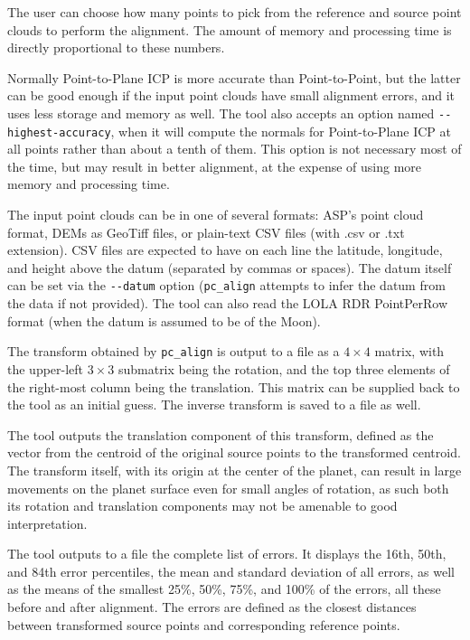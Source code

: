 The user can choose how many points to pick from the reference and
source point clouds to perform the alignment. The amount of memory and
processing time is directly proportional to these numbers.

Normally Point-to-Plane ICP is more accurate than Point-to-Point, but
the latter can be good enough if the input point clouds have small
alignment errors, and it uses less storage and memory as well.  The tool
also accepts an option named \texttt{-\/-highest-accuracy}, when it will
compute the normals for Point-to-Plane ICP at all points rather than
about a tenth of them. This option is not necessary most of the time,
but may result in better alignment, at the expense of using more memory
and processing time.

The input point clouds can be in one of several formats: ASP's point
cloud format, DEMs as GeoTiff files, or plain-text CSV files (with .csv
or .txt extension). CSV files are expected to have on each line the
latitude, longitude, and height above the datum (separated by commas or
spaces). The datum itself can be set via the \texttt{-\/-datum} option
(\texttt{pc\_align} attempts to infer the datum from the data if not
provided).  The tool can also read the LOLA RDR PointPerRow format (when
the datum is assumed to be of the Moon).

The transform obtained by \texttt{pc\_align} is output to a file as a
$4\times 4$ matrix, with the upper-left $3\times 3$ submatrix being the
rotation, and the top three elements of the right-most column being the
translation. This matrix can be supplied back to the tool as an initial
guess. The inverse transform is saved to a file as well.

The tool outputs the translation component of this transform, defined
as the vector from the centroid of the original source points to the transformed
centroid. The transform itself, with its origin at the center of the planet,
can result in large movements on the planet surface even for small angles
of rotation, as such both its rotation and translation components may not
be amenable to good interpretation.

The tool outputs to a file the complete list of errors. It displays the
16th, 50th, and 84th error percentiles, the mean and standard deviation
of all errors, as well as the means of the smallest 25\%, 50\%, 75\%,
and 100\% of the errors, all these before and after alignment. The
errors are defined as the closest distances between transformed source
points and corresponding reference points.

